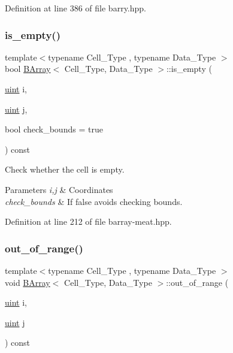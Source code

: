 Definition at line 386 of file barry.\+hpp.

\mbox{\label{class_b_array_a37ed3962c0ee5030b23cb6cde23a5cdf}} 
\subsubsection{\texorpdfstring{is\+\_\+empty()}{is\_empty()}}
{\footnotesize\ttfamily template$<$typename Cell\+\_\+\+Type , typename Data\+\_\+\+Type $>$ \\
bool \hyperlink{class_b_array}{B\+Array}$<$ Cell\+\_\+\+Type, Data\+\_\+\+Type $>$\+::is\+\_\+empty (\begin{DoxyParamCaption}\item[{\hyperlink{typedefs_8hpp_a91ad9478d81a7aaf2593e8d9c3d06a14}{uint}}]{i,  }\item[{\hyperlink{typedefs_8hpp_a91ad9478d81a7aaf2593e8d9c3d06a14}{uint}}]{j,  }\item[{bool}]{check\+\_\+bounds = {\ttfamily true} }\end{DoxyParamCaption}) const\hspace{0.3cm}{\ttfamily [inline]}}



Check whether the cell is empty. 


\begin{DoxyParams}{Parameters}
{\em i,j} & Coordinates \\
\hline
{\em check\+\_\+bounds} & If {\ttfamily false} avoids checking bounds. \\
\hline
\end{DoxyParams}


Definition at line 212 of file barray-\/meat.\+hpp.

\mbox{\label{class_b_array_a87bad4dcad82009d5721d21808b7e469}} 
\subsubsection{\texorpdfstring{out\+\_\+of\+\_\+range()}{out\_of\_range()}}
{\footnotesize\ttfamily template$<$typename Cell\+\_\+\+Type , typename Data\+\_\+\+Type $>$ \\
void \hyperlink{class_b_array}{B\+Array}$<$ Cell\+\_\+\+Type, Data\+\_\+\+Type $>$\+::out\+\_\+of\+\_\+range (\begin{DoxyParamCaption}\item[{\hyperlink{typedefs_8hpp_a91ad9478d81a7aaf2593e8d9c3d06a14}{uint}}]{i,  }\item[{\hyperlink{typedefs_8hpp_a91ad9478d81a7aaf2593e8d9c3d06a14}{uint}}]{j }\end{DoxyParamCaption}) const\hspace{0.3cm}{\ttfamily [inline]}}



